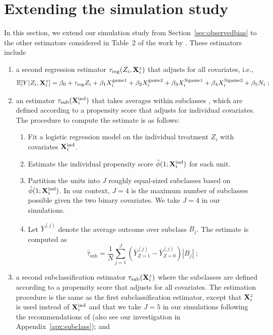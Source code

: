 \documentclass[10pt]{article}
\begin{document}
\section{Extending the simulation study} \label{sec:extension}

In this section, we extend our simulation study from Section~\ref{sec:observedbias} to the other estimators considered in Table~2 of the work by \textcite{Forastiere:2021}. These estimators include
\begin{enumerate}

\item
a second regression estimator $\tau_\text{reg}(Z_i,\mathbf{X}_i^z)$ that adjusts for all covariates, i.e.,
\[
\mathbb{E}[Y|Z_i,\mathbf{X}_i^z] = \beta_0 + \tau_\text{reg}Z_i + \beta_1X_i^\text{game1} + \beta_2X_i^\text{game2} + \beta_3X_i^\text{Ngame1} + \beta_4X_i^\text{Ngame2} + \beta_5N_i\;;
\]
\item
an estimator $\tau_\text{sub}(\mathbf{X}^{\text{ind}}_i)$ that takes averages within subclasses \parencite{Imbens:2015}, which are defined according to a propensity score that adjusts for individual covariates. The procedure to compute the estimate is as follows:
\begin{enumerate}
\item
Fit a logistic regression model on the individual treatment $Z_i$ with covariates $\mathbf{X}^{\text{ind}}_i$.
\item
Estimate the individual propensity score $\hat{\phi}(1;\mathbf{X}^{\text{ind}}_i)$ for each unit.
\item
Partition the units into $J$ roughly equal-sized subclasses based on $\hat{\phi}(1;\mathbf{X}^{\text{ind}}_i)$. In our context, $J=4$ is the maximum number of subclasses possible given the two binary covariates. We take $J=4$ in our simulations.
\item
Let $\bar{Y}^{(j)}$ denote the average outcome over subclass $B_j$. The estimate is computed as
\[
\hat{\tau}_\text{sub} = \frac{1}{N}\sum_{j=1}^J\left(\bar{Y}_{Z=1}^{(j)}-\bar{Y}_{Z=0}^{(j)}\right)|B_j| \;;
\]
\end{enumerate}

\item
a second subclassification estimator $\tau_\text{sub}(\mathbf{X}^z_i)$ where the subclasses are defined according to a propensity score that adjusts for all covariates. The estimation procedure is the same as the first subclassification estimator, except that $\mathbf{X}^z_i$ is used instead of $\mathbf{X}^{\text{ind}}_i$ and that we take $J=5$ in our simulations following the recommendations of \textcite{Rosenbaum:1984} (also see our investigation in Appendix~\ref{apx:subclass}); and


\end{enumerate}
\end{document}
